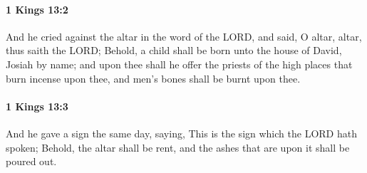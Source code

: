 		\paragraph{1 Kings 13:2} %
			\label{1KINGS-13-2}

			And he cried against the altar in the word of the LORD, and said, O altar, altar, thus saith the LORD; Behold, a child shall be born unto the house of David, Josiah by name; and upon thee shall he offer the priests of the high places that burn incense upon thee, and men’s bones shall be burnt upon thee.


		\paragraph{1 Kings 13:3} %
			\label{1KINGS-13-3}

			And he gave a sign the same day, saying, This is the sign which the LORD hath spoken; Behold, the altar shall be rent, and the ashes that are upon it shall be poured out.

